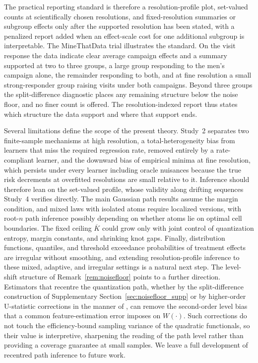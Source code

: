 \documentclass[11pt]{article}
\begin{document}
The practical reporting standard is therefore a resolution-profile plot, set-valued counts at scientifically chosen resolutions, and fixed-resolution summaries or subgroup effects only after the supported resolution has been stated, with a penalized report added when an effect-scale cost for one additional subgroup is interpretable. The MineThatData trial illustrates the standard. On the visit response the data indicate clear average campaign effects and a summary supported at two to three groups, a large group responding to the men's campaign alone, the remainder responding to both, and at fine resolution a small strong-responder group raising visits under both campaigns. Beyond three groups the split-difference diagnostic places any remaining structure below the noise floor, and no finer count is offered. The resolution-indexed report thus states which structure the data support and where that support ends.

Several limitations define the scope of the present theory. Study~2 separates two finite-sample mechanisms at high resolution, a total-heterogeneity bias from learners that miss the required regression rate, removed entirely by a rate-compliant learner, and the downward bias of empirical minima at fine resolution, which persists under every learner including oracle nuisances because the true risk decrements at overfitted resolutions are small relative to it. Inference should therefore lean on the set-valued profile, whose validity along drifting sequences Study~4 verifies directly. The main Gaussian path results assume the margin condition, and mixed laws with isolated atoms require localized versions, with root-$n$ path inference possibly depending on whether atoms lie on optimal cell boundaries. The fixed ceiling $\overline K$ could grow only with joint control of quantization entropy, margin constants, and shrinking knot gaps. Finally, distribution functions, quantiles, and threshold exceedance probabilities of treatment effects are irregular without smoothing, and extending resolution-profile inference to these mixed, adaptive, and irregular settings is a natural next step.
The level-shift structure of Remark~\ref{rem:noisefloor} points to a further direction. Estimators that recentre the quantization path, whether by the split-difference construction of Supplementary Section~\ref{sec:noisefloor_supp} or by higher-order U-statistic corrections in the manner of \cite{robins2008}, can remove the second-order level bias that a common feature-estimation error imposes on $W(\cdot)$. Such corrections do not touch the efficiency-bound sampling variance of the quadratic functionals, so their value is interpretive, sharpening the reading of the path level rather than providing a coverage guarantee at small samples. We leave a full development of recentred path inference to future work.
\end{document}
